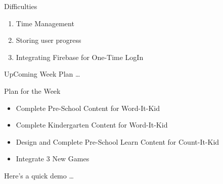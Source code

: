 \documentclass[14pt]{beamer}
\begin{document}
\begin{frame}{Difficulties}
    \begin{enumerate}
	\item Time Management
        \item Storing user progress
	\item Integrating Firebase for One-Time LogIn
    \end{enumerate}
\end{frame}

\begin{frame}[standout]
    \alert{UpComing Week Plan \ldots}
\end{frame}

\begin{frame}{Plan for the Week}
    \begin{itemize}
            \pause
        \item Complete Pre-School Content for Word-It-Kid\\
            \pause
        \item Complete Kindergarten Content for Word-It-Kid\\
            \pause
        \item Design and Complete Pre-School Learn Content for Count-It-Kid\\
            \pause
	\item Integrate 3 New Games
    \end{itemize}
\end{frame}


\begin{frame}[standout]
    Here's a quick demo \ldots
\end{frame}
\end{document}

